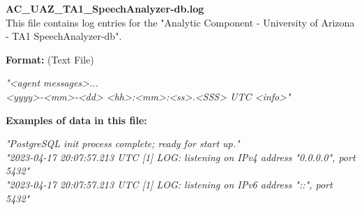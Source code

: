 \begin{description}
\begin{addmargin}[0em]{0em}
    \label{AC_UAZ_TA1_SpeechAnalyzer-db.log}
    \begin{addmargin}[1em]{0em} %
        \textbf{AC\_UAZ\_TA1\_SpeechAnalyzer-db.log}\\
        This file contains log entries for the "Analytic Component - University of Arizona - TA1 SpeechAnalyzer-db".
        \begin{addmargin}[1em]{0em}
            \textbf{Format:} (Text File)
            \begin{addmargin}[1em]{0em}
                \textit{"<agent messages>...\\<yyyy>-<mm>-<dd> <hh>:<mm>:<ss>.<SSS> UTC <info>"}
            \end{addmargin}
        \end{addmargin}
        \begin{addmargin}[1em]{0em}
            \textbf{Examples of data in this file:}
            \begin{addmargin}[1em]{0em}\textit{"PostgreSQL init process complete; ready for start up."\\
                "2023-04-17 20:07:57.213 UTC [1] LOG:  listening on IPv4 address "0.0.0.0", port 5432"\\
                "2023-04-17 20:07:57.213 UTC [1] LOG:  listening on IPv6 address "::", port 5432"}
            \end{addmargin}
        \end{addmargin}
    \end{addmargin} %
    \textbf{\\}


\end{addmargin}
\end{description}
